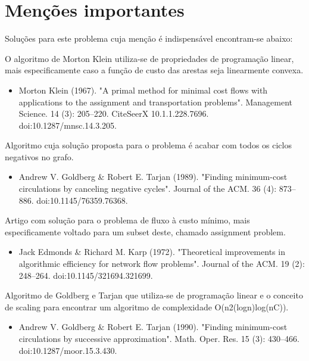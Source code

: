 \documentclass[12pt, a4]{article}
\begin{document}
\section{Menções importantes}
\label{sec:important-mentions}

Soluções para este problema cuja menção é indispensável encontram-se abaixo:

O algoritmo de Morton Klein utiliza-se de propriedades de programação linear,
mais especificamente caso a função de custo das arestas seja linearmente
convexa.

\begin{itemize}
\item Morton Klein (1967). "A primal method for minimal cost flows with
    applications to the assignment and transportation problems". Management
    Science. 14 (3): 205–220. CiteSeerX 10.1.1.228.7696.
    doi:10.1287/mnsc.14.3.205.
\end{itemize}

Algoritmo cuja solução proposta para o problema é acabar com todos os ciclos
negativos no grafo.

\begin{itemize}
\item Andrew V. Goldberg \& Robert E. Tarjan (1989). "Finding minimum-cost
    circulations by canceling negative cycles". Journal of the ACM. 36 (4):
    873–886. doi:10.1145/76359.76368.
\end{itemize}

Artigo com solução para o problema de fluxo à custo mínimo, mais especificamente
voltado para um subset deste, chamado assignment problem.

\begin{itemize}
\item Jack Edmonds \& Richard M. Karp (1972). "Theoretical improvements in
    algorithmic efficiency for network flow problems". Journal of the ACM. 19
    (2): 248–264. doi:10.1145/321694.321699.
\end{itemize}

Algoritmo de Goldberg e Tarjan que utiliza-se de programação linear e o conceito
de scaling para encontrar um algoritmo de complexidade O(n2(logn)log(nC)).

\begin{itemize}
\item Andrew V. Goldberg \& Robert E. Tarjan (1990). "Finding minimum-cost
  circulations by successive approximation". Math. Oper. Res. 15 (3): 430–466.
  doi:10.1287/moor.15.3.430.
\end{itemize}
\end{document}
